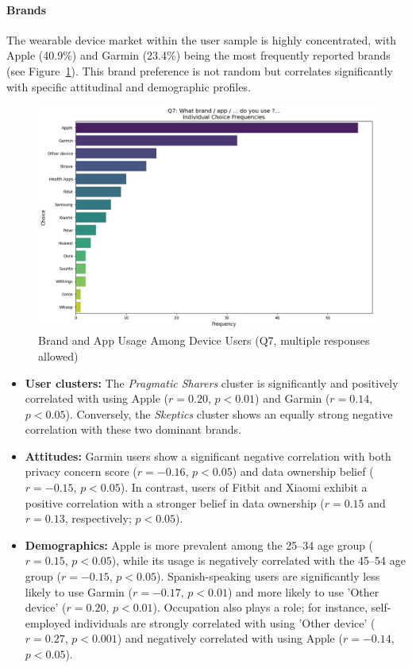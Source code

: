 	\paragraph{Brands}
	The wearable device market within the user sample is highly concentrated, with Apple (40.9\%) and Garmin (23.4\%) being the most frequently reported brands (see Figure~\ref{fig:Q7_brand_app}). This brand preference is not random but correlates significantly with specific attitudinal and demographic profiles.
	\begin{figure}[ht]\centering
		\includegraphics[width=1\linewidth]{figures/questions/Q7_multiple_choice.png}
		\caption{Brand and App Usage Among Device Users (Q7, multiple responses allowed)}
		\label{fig:Q7_brand_app}
	\end{figure}
	\begin{itemize}
		\item \textbf{User clusters:} The \textit{Pragmatic Sharers} cluster is significantly and positively correlated with using Apple ($r = 0.20$, $p < 0.01$) and Garmin ($r = 0.14$, $p < 0.05$). Conversely, the \textit{Skeptics} cluster shows an equally strong negative correlation with these two dominant brands.
		\item \textbf{Attitudes:} Garmin users show a significant negative correlation with both privacy concern score ($r = -0.16$, $p < 0.05$) and data ownership belief ($r = -0.15$, $p < 0.05$). In contrast, users of Fitbit and Xiaomi exhibit a positive correlation with a stronger belief in data ownership ($r = 0.15$ and $r = 0.13$, respectively; $p < 0.05$).
		\item \textbf{Demographics:} Apple is more prevalent among the 25--34 age group ($r = 0.15$, $p < 0.05$), while its usage is negatively correlated with the 45--54 age group ($r = -0.15$, $p < 0.05$). Spanish-speaking users are significantly less likely to use Garmin ($r = -0.17$, $p < 0.01$) and more likely to use 'Other device' ($r = 0.20$, $p < 0.01$). Occupation also plays a role; for instance, self-employed individuals are strongly correlated with using 'Other device' ($r = 0.27$, $p < 0.001$) and negatively correlated with using Apple ($r = -0.14$, $p < 0.05$).
	\end{itemize}
